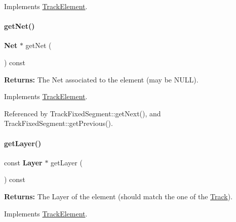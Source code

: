 Implements \mbox{\hyperlink{classKite_1_1TrackElement_ae35b78590ed6aa546b626ef95f28c533}{Track\+Element}}.

\mbox{\label{classKite_1_1TrackFixedSegment_a692492374623a5c6096b2c4a51190359}} 
\paragraph{\texorpdfstring{get\+Net()}{getNet()}}
{\footnotesize\ttfamily \textbf{ Net} $\ast$ get\+Net (\begin{DoxyParamCaption}{ }\end{DoxyParamCaption}) const\hspace{0.3cm}{\ttfamily [virtual]}}

{\bfseries Returns\+:} The Net associated to the element (may be {\ttfamily N\+U\+LL}). 

Implements \mbox{\hyperlink{classKite_1_1TrackElement_a2b383a5b6f5028911a35e446a682dabd}{Track\+Element}}.



Referenced by Track\+Fixed\+Segment\+::get\+Next(), and Track\+Fixed\+Segment\+::get\+Previous().

\mbox{\label{classKite_1_1TrackFixedSegment_ab045567c4f529dca7790d66c17c3084f}} 
\paragraph{\texorpdfstring{get\+Layer()}{getLayer()}}
{\footnotesize\ttfamily const \textbf{ Layer} $\ast$ get\+Layer (\begin{DoxyParamCaption}{ }\end{DoxyParamCaption}) const\hspace{0.3cm}{\ttfamily [virtual]}}

{\bfseries Returns\+:} The Layer of the element (should match the one of the \mbox{\hyperlink{classKite_1_1Track}{Track}}). 

Implements \mbox{\hyperlink{classKite_1_1TrackElement_ad96c66549598873bf68c2e18ec7164c1}{Track\+Element}}.

